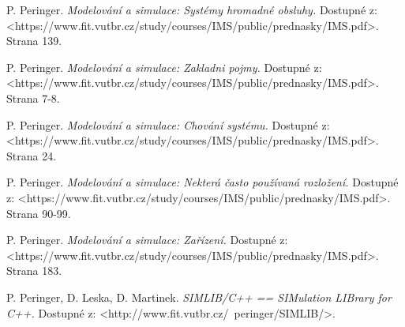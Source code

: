 \documentclass[12pt,a4paper]{article}
\begin{document}
\begin{thebibliography}{99}

 P. Peringer.
\textit{Modelování a simulace: Systémy hromadné obsluhy.}
Dostupné z: \textless https://www.fit.vutbr.cz/study/courses/IMS/public/prednasky/IMS.pdf\textgreater.
Strana 139.

 P. Peringer.
\textit{Modelování a simulace: Zakladni pojmy.}
Dostupné z: \textless https://www.fit.vutbr.cz/study/courses/IMS/public/prednasky/IMS.pdf\textgreater.
Strana 7-8.

 P. Peringer.
\textit{Modelování a simulace: Chování systému.}
Dostupné z: \textless https://www.fit.vutbr.cz/study/courses/IMS/public/prednasky/IMS.pdf\textgreater.
Strana 24.

 P. Peringer.
\textit{Modelování a simulace: Nekterá často používaná rozložení.}
Dostupné z: \textless https://www.fit.vutbr.cz/study/courses/IMS/public/prednasky/IMS.pdf\textgreater.
Strana 90-99.

 P. Peringer.
\textit{Modelování a simulace: Zařízení.}
Dostupné z: \textless https://www.fit.vutbr.cz/study/courses/IMS/public/prednasky/IMS.pdf\textgreater.
Strana 183.

 P. Peringer, D. Leska, D. Martinek.
\textit{SIMLIB/C++  ==  SIMulation LIBrary for C++.}
Dostupné z: \textless http://www.fit.vutbr.cz/~peringer/SIMLIB/\textgreater.


\end{thebibliography}
\end{document}
